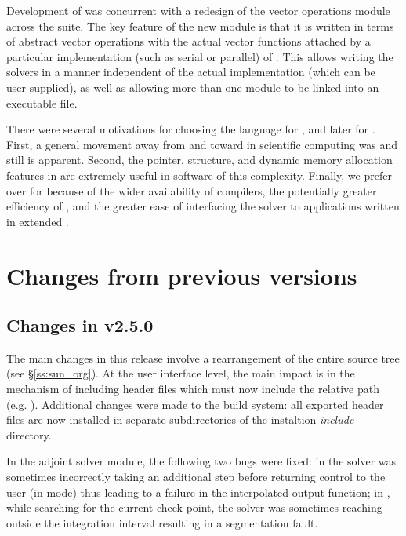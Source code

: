 Development of {\cvodes} was concurrent with a redesign of the vector
operations module across the {\sundials} suite. The key feature of the
new {\nvector} module is that it is written in terms of abstract
vector operations with the actual vector functions attached by a
particular implementation (such as serial or parallel) of
{\nvector}. This allows writing the {\sundials} solvers in a manner
independent of the actual {\nvector} implementation (which can be
user-supplied), as well as allowing more than one {\nvector} module to
be linked into an executable file.

 There were
several motivations for choosing the {\C} language for {\cvode}, and
later for {\cvodes}.  First, a general movement away from {\F} and
toward {\C} in scientific computing was and still is apparent.
Second, the pointer, structure, and dynamic memory allocation features
in {\C} are extremely useful in software of this complexity.  Finally,
we prefer {\C} over {\CPP} for {\cvodes} because of the wider
availability of {\C} compilers, the potentially greater efficiency of
{\C}, and the greater ease of interfacing the solver to applications
written in extended {\F}.  

\section{Changes from previous versions}

\subsection*{Changes in v2.5.0}

The main changes in this release involve a rearrangement of the entire 
{\sundials} source tree (see \S\ref{ss:sun_org}). At the user interface 
level, the main impact is in the mechanism of including {\sundials} header
files which must now include the relative path (e.g. ).
Additional changes were made to the build system: all exported header files are
now installed in separate subdirectories of the instaltion {\em include} directory.

In the adjoint solver module, the following two bugs were fixed: in 
the solver was sometimes incorrectly taking an additional step before
returning control to the user (in  mode) thus leading to 
a failure in the interpolated output function; in , while searching
for the current check point, the solver was sometimes reaching outside the
integration interval resulting in a segmentation fault.

